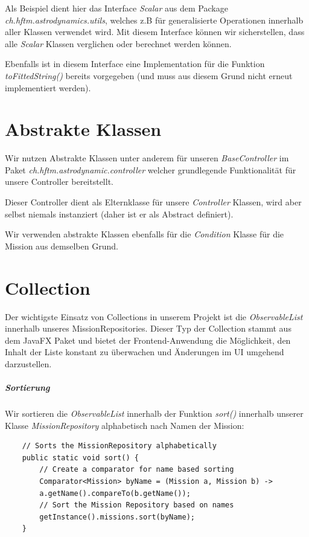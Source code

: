Als Beispiel dient hier das Interface \textit{Scalar} aus dem Package \textit{ch.hftm.astrodynamics.utils}, welches z.B für generalisierte Operationen innerhalb aller Klassen verwendet wird. Mit diesem Interface können wir sicherstellen, dass alle \textit{Scalar} Klassen verglichen oder berechnet werden können.

Ebenfalls ist in diesem Interface eine Implementation für die Funktion \textit{toFittedString()} bereits vorgegeben (und muss aus diesem Grund nicht erneut implementiert werden).

\section{Abstrakte Klassen}

Wir nutzen Abstrakte Klassen unter anderem für unseren \textit{BaseController} im Paket \textit{ch.hftm.astrodynamic.controller} welcher grundlegende Funktionalität für unsere Controller bereitstellt.

Dieser Controller dient als Elternklasse für unsere \textit{Controller} Klassen, wird aber selbst niemals instanziert (daher ist er als Abstract definiert).

Wir verwenden abstrakte Klassen ebenfalls für die \textit{Condition} Klasse für die Mission aus demselben Grund.

\section{Collection}

Der wichtigste Einsatz von Collections in unserem Projekt ist die \textit{ObservableList} innerhalb unseres MissionRepositories.
Dieser Typ der Collection stammt aus dem JavaFX Paket und bietet der Frontend-Anwendung die Möglichkeit, den Inhalt der Liste konstant zu überwachen und Änderungen im UI umgehend darzustellen.


\subparagraph{Sortierung}

Wir sortieren die \textit{ObservableList} innerhalb der Funktion \textit{sort()} innerhalb unserer Klasse \textit{MissionRepository} alphabetisch nach Namen der Mission:


\begin{lstlisting}
	// Sorts the MissionRepository alphabetically
	public static void sort() {
		// Create a comparator for name based sorting 
		Comparator<Mission> byName = (Mission a, Mission b) ->
		a.getName().compareTo(b.getName());
		// Sort the Mission Repository based on names
		getInstance().missions.sort(byName);
	}
\end{lstlisting}

